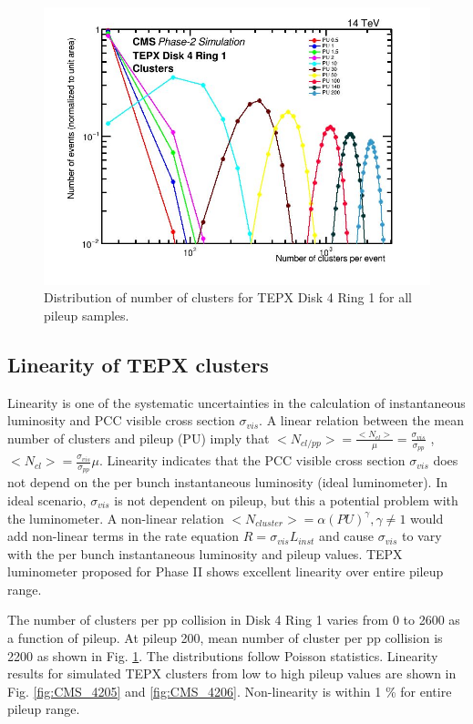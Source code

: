 \begin{figure}[H]
  \centering
  \includegraphics[width=0.7\columnwidth]{ashish_thesis/tepx_D4R!_clusters._allpu_1.png}
  \caption[D4R1 Clusters All Pileup]{Distribution of number of clusters for TEPX Disk 4 Ring 1 for all pileup samples.}
  \label{fig:tepx_cl_allPU}
\end{figure}

\subsection{Linearity of TEPX clusters}

Linearity is one of the systematic uncertainties in the calculation of instantaneous luminosity and PCC visible cross section $\sigma_{vis}$. A linear relation between the mean number of clusters and pileup (PU) imply that $<N_{cl/pp}> = \frac{<N_{cl}>}{\mu} = \frac{\sigma_{vis}}{\sigma_{pp}}$ , $<N_{cl}> =  \frac{\sigma_{vis}}{\sigma_{pp}} \mu $. Linearity indicates that the PCC visible cross section $\sigma_{vis}$ does not depend on the per bunch instantaneous luminosity (ideal luminometer). In ideal scenario, $\sigma_{vis}$ is not dependent on pileup, but this a potential problem with the luminometer. A non-linear relation $<N_{cluster}> = \alpha (PU)^{\gamma}, \gamma \neq 1$ would add non-linear terms in the rate equation $R = \sigma_{vis} L_{inst}$ and cause $\sigma_{vis}$ to vary with the per bunch instantaneous luminosity and pileup values. TEPX luminometer proposed for Phase II shows excellent linearity over entire pileup range.

The number of clusters per pp collision in Disk 4 Ring 1 varies from 0 to 2600 as a function of pileup. At pileup 200, mean number of cluster per pp collision is 2200 as shown in Fig. \ref{fig:tepx_cl_allPU}.
The distributions follow Poisson statistics. Linearity results for simulated TEPX clusters from low to high pileup values are shown in  Fig. \ref{fig:CMS_4205} and \ref{fig:CMS_4206}. Non-linearity is within 1 \% for entire pileup range.


